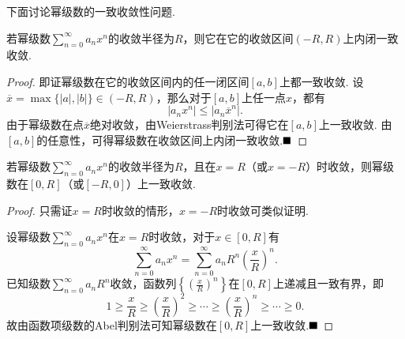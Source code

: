 下面讨论幂级数的一致收敛性问题.
\begin{theorem}
	若幂级数$\displaystyle\sum_{n=0}^{\infty}a_nx^n$的收敛半径为$R$，则它在它的收敛区间$(-R,R)$上内闭一致收敛.
\end{theorem}
\begin{proof}
	即证幂级数在它的收敛区间内的任一闭区间$\left[a,b\right]$上都一致收敛. 设$\overline{x}=\max\{|a|,|b|\}\in(-R,R)$，那么对于$\left[a,b\right]$上任一点$x$，都有
	$$|a_nx^n|\leqslant|a_n\overline{x}^n|.$$
	由于幂级数在点$\overline{x}$绝对收敛，由Weierstrass判别法可得它在$\left[a,b\right]$上一致收敛. 由$\left[a,b\right]$的任意性，可得幂级数在收敛区间上内闭一致收敛.$\hfill\blacksquare$
\end{proof}
\begin{theorem}
	若幂级数$\displaystyle\sum_{n=0}^{\infty}a_nx^n$的收敛半径为$R$，且在$x=R$（或$x=-R$）时收敛，则幂级数在$\left[0,R\right]$（或$\left[-R,0\right]$）上一致收敛.
\end{theorem}
\begin{proof}
	只需证$x=R$时收敛的情形，$x=-R$时收敛可类似证明.
	
	设幂级数$\displaystyle\sum_{n=0}^{\infty}a_nx^n$在$x=R$时收敛，对于$x\in\left[0,R\right]$有
	$$\sum_{n=0}^{\infty}a_nx^n=\sum_{n=0}^{\infty}a_nR^n\left(\frac{x}{R}\right)^n.$$
	已知级数$\displaystyle\sum_{n=0}^{\infty}a_nR^n$收敛，函数列$\left\{\left(\frac{x}{R}\right)^n\right\}$在$\left[0,R\right]$上递减且一致有界，即
	$$1\geqslant\frac{x}{R}\geqslant\left(\frac{x}{R}\right)^2\geqslant\cdots\geqslant\left(\frac{x}{R}\right)^n\geqslant\cdots\geqslant 0.$$
	故由函数项级数的Abel判别法可知幂级数在$\left[0,R\right]$上一致收敛.$\hfill\blacksquare$
\end{proof}

